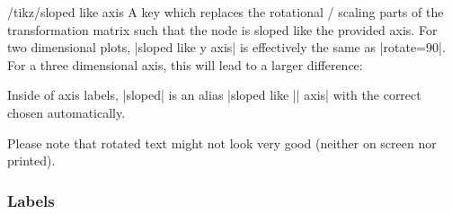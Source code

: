 \begin{pgfplotsxykeylist}{/tikz/sloped like \x\space axis}
	A key which replaces the rotational / scaling parts of the transformation matrix such that the node is sloped like the provided axis. For two dimensional plots, |sloped like y axis| is effectively the same as |rotate=90|. For a three dimensional axis, this will lead to a larger difference:
\begin{codeexample}[]
\end{codeexample}

	Inside of axis labels, |sloped| is an alias |sloped like || axis| with the correct  chosen automatically.

	Please note that rotated text might not look very good (neither on screen nor printed).
\end{pgfplotsxykeylist}


\subsubsection{Labels}

